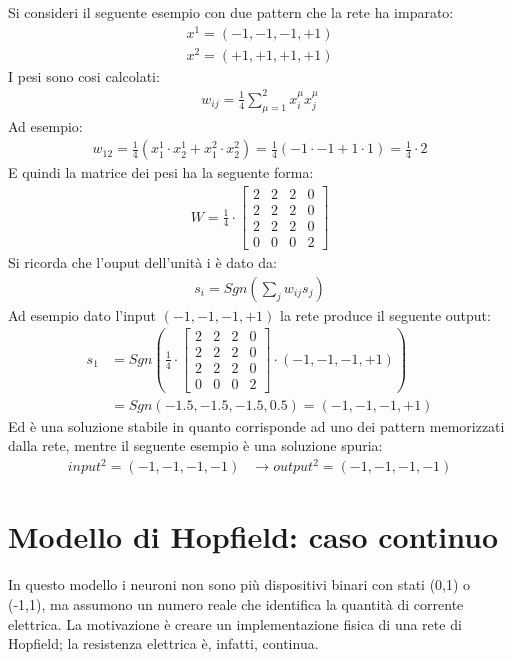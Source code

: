 Si consideri il seguente esempio con due pattern che la rete ha imparato:
\begin{align*}
	x^1 = (-1,-1,-1,+1) \\
	x^2 = (+1,+1,+1,+1)
\end{align*}
I pesi sono cosi calcolati:
\begin{align*}
	w_{ij} = \frac{1}{4} \sum_{\mu=1}^2 x_i^\mu x_j^\mu
\end{align*} 
Ad esempio:
\begin{align*}
	w_{12} = \frac{1}{4}(x^1_1 \cdot x^1_2 + x^2_1 \cdot x^2_2) = 
	\frac{1}{4}(-1 \cdot -1 + 1 \cdot 1) = \frac{1}{4} \cdot 2
\end{align*}
E quindi la matrice dei pesi ha la seguente forma:
\begin{align*}
	W = \frac{1}{4} \cdot
	\begin{bmatrix}
		2 & 2 & 2 & 0 \\
		2 & 2 & 2 & 0 \\
		2 & 2 & 2 & 0 \\
		0 & 0 & 0 & 2
	\end{bmatrix}
\end{align*}
Si ricorda che l'ouput dell'unità i è dato da:
\begin{align*}
	s_i = Sgn \left(\sum_j w_{ij} s_j \right)
\end{align*}
Ad esempio dato l'input $(-1,-1,-1,+1)$ la rete produce il seguente output:
\begin{align*}
	s_1 &= Sgn \left( \frac{1}{4} \cdot
	\begin{bmatrix}
		2 & 2 & 2 & 0 \\
		2 & 2 & 2 & 0 \\
		2 & 2 & 2 & 0 \\
		0 & 0 & 0 & 2
	\end{bmatrix} \cdot (-1, -1, -1, +1) \right) \\ 
	&= Sgn(-1.5, -1.5, -1.5, 0.5) = (-1,-1,-1,+1)
\end{align*}
Ed è una soluzione stabile in quanto corrisponde ad uno dei pattern memorizzati dalla rete, mentre il seguente esempio è una soluzione spuria:
\begin{align*}
	input^2 = (-1,-1,-1,-1)&\longrightarrow output^2 = (-1,-1,-1,-1) \tag{spuria}
\end{align*}


\newpage


\section{Modello di Hopfield: caso continuo} %
\label{sec:modello_di_hopfield_caso_continuo}
In questo modello i neuroni non sono più dispositivi binari con stati (0,1) o (-1,1), ma assumono un numero reale che identifica la quantità di corrente elettrica. La motivazione è creare un implementazione fisica di una rete di Hopfield; la resistenza elettrica è, infatti, continua.\\

